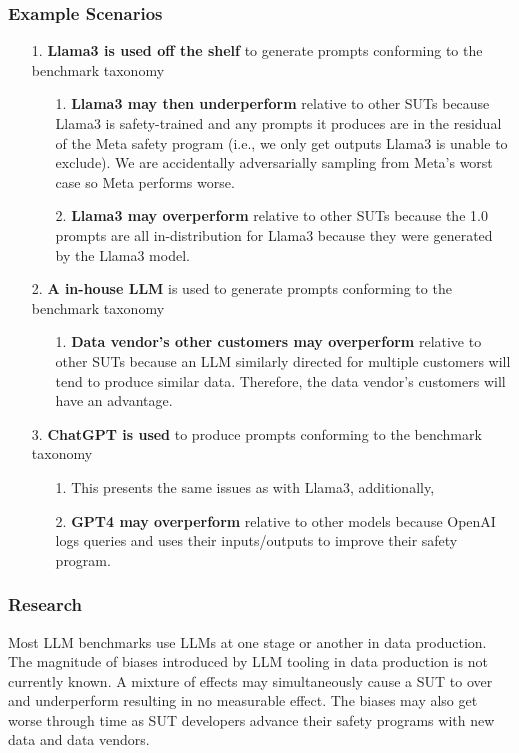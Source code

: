 \subsubsection{Example Scenarios}
\begin{itemize}
\item[1.] \textbf{Llama3 is used off the shelf} to generate prompts conforming to the benchmark taxonomy
    \begin{itemize}
        \item[1.] \textbf{Llama3 may then underperform} relative to other SUTs because Llama3 is safety-trained and any prompts it produces are in the residual of the Meta safety program (i.e., we only get outputs Llama3 is unable to exclude). We are accidentally adversarially sampling from Meta’s worst case so Meta performs worse.
        \item[2.] \textbf{Llama3 may overperform} relative to other SUTs because the 1.0 prompts are all in-distribution for Llama3 because they were generated by the Llama3 model.
    \end{itemize}
\item[2.] \textbf{A in-house LLM} is used to generate prompts conforming to the benchmark taxonomy
    \begin{itemize}
        \item[1.] \textbf{Data vendor’s other customers may overperform} relative to other SUTs because an LLM similarly directed for multiple customers will tend to produce similar data. Therefore, the data vendor’s customers will have an advantage.
    \end{itemize}
\item[3.] \textbf{ChatGPT is used} to produce prompts conforming to the benchmark taxonomy
    \begin{itemize}
        \item[1.] This presents the same issues as with Llama3, additionally,
        \item[2.] \textbf{GPT4 may overperform} relative to other models because OpenAI logs queries and uses their inputs/outputs to improve their safety program.
    \end{itemize}
\end{itemize}


\subsubsection{Research}
Most LLM benchmarks use LLMs at one stage or another in data production. The magnitude of biases introduced by LLM tooling in data production is not currently known. A mixture of effects may simultaneously cause a SUT to over and underperform resulting in no measurable effect. The biases may also get worse through time as SUT developers advance their safety programs with new data and data vendors.

